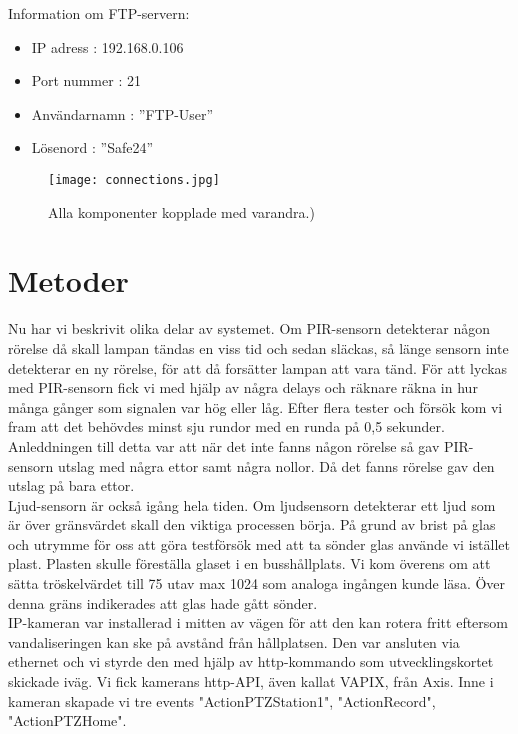 Information om FTP-servern:

\begin{itemize}
\item IP adress : 192.168.0.106

\item Port nummer : 21

\item Användarnamn : ”FTP-User”

\item Lösenord : ”Safe24”

\end{itemize}

\begin{figure}[h]

  \texttt{[image: connections.jpg]}
  \caption{Alla komponenter kopplade med varandra.)}
  \label{fig:connections}
\end{figure}
\clearpage



\section{Metoder}
Nu har vi beskrivit olika delar av systemet. Om PIR-sensorn detekterar någon rörelse då skall lampan tändas en viss tid och sedan släckas, så länge sensorn inte detekterar en ny rörelse, för att då forsätter lampan att vara tänd. För att lyckas med PIR-sensorn fick vi med hjälp av några delays och räknare räkna in hur många gånger som signalen var hög eller låg. Efter flera tester och försök kom vi fram att det behövdes minst sju rundor med en runda på 0,5 sekunder. Anleddningen till detta var att när det inte fanns någon rörelse så gav PIR-sensorn utslag med några ettor samt några nollor. Då det fanns rörelse gav den utslag på bara ettor.\\

 Ljud-sensorn är också igång hela tiden. Om ljudsensorn detekterar ett ljud som är över gränsvärdet skall den viktiga processen börja. På grund av brist på glas och utrymme för oss att göra testförsök med att ta sönder glas använde vi istället plast. Plasten skulle föreställa glaset i en busshållplats. Vi kom överens om att sätta tröskelvärdet till 75 utav max 1024 som analoga ingången kunde läsa. Över denna gräns indikerades att glas hade gått sönder.\\

IP-kameran var installerad i mitten av vägen för att den kan rotera fritt eftersom vandaliseringen kan ske på avstånd från hållplatsen. Den var ansluten via ethernet och vi styrde den med hjälp av http-kommando som utvecklingskortet skickade iväg. Vi fick kamerans http-API, även kallat VAPIX, från Axis. Inne i kameran skapade vi tre events "ActionPTZStation1", "ActionRecord", "ActionPTZHome".


